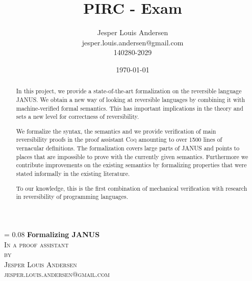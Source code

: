 \documentclass[a4paper, oneside, 10pt, draft]{memoir}
\author{Jesper Louis
  Andersen\\jesper.louis.andersen@gmail.com\\140280-2029}
\title{PIRC - Exam}
\date{\today}
\makeatletter
\renewcommand*{\titleM}{\begingroup%
  \drop = 0.08\textheight
  \centering
  {\Huge\bfseries Formalizing JANUS}\\[\baselineskip]
  {\scshape In a proof assistant}\\[\baselineskip]
  {\scshape by}\\[\baselineskip]
  {\large\scshape Jesper Louis Andersen\\jesper.louis.andersen@gmail.com}\par
  \endgroup}
\makeatother
\begin{document}
\newcommand{\janusz}{$\mathrm{JANUS}_0$}
\newcommand{\januso}{$\mathrm{JANUS}_1$}
\newcommand{\lift}[1]{\lfloor #1 \rfloor}
\newcommand{\coq}{{\scshape Coq}}
\newcommand{\twelf}{{\scshape Twelf}}
\newcommand{\gallina}{{\scshape Gallina}}
\newcommand{\NN}{\mathbb{N}}
\newcommand{\ZZ}{\mathbb{Z}}
\titleM
\begin{abstract}
  In this project, we provide a state-of-the-art formalization on the
  reversible language JANUS. We obtain a
  new way of looking at reversible languages by combining it with
  machine-verified formal semantics. This has important implications
  in the theory and sets a new level for correctness of reversibility.

  We formalize the syntax, the semantics
  and we provide verification of main reversibility proofs in the
  proof assistant \coq{} amounting to over 1500 lines of vernacular
  definitions. The formalization covers large parts of JANUS and
  points to places that are impossible to prove with the currently
  given semantics. Furthermore we contribute improvements on the existing
  semantics by formalizing properties that were stated informally in
  the existing literature.

  To our knowledge, this is the first combination of mechanical
  verification with research in reversibility of programming
  languages.
\end{abstract}
\listoffixmes
\tableofcontents
{}








\appendix
%
\end{document}
